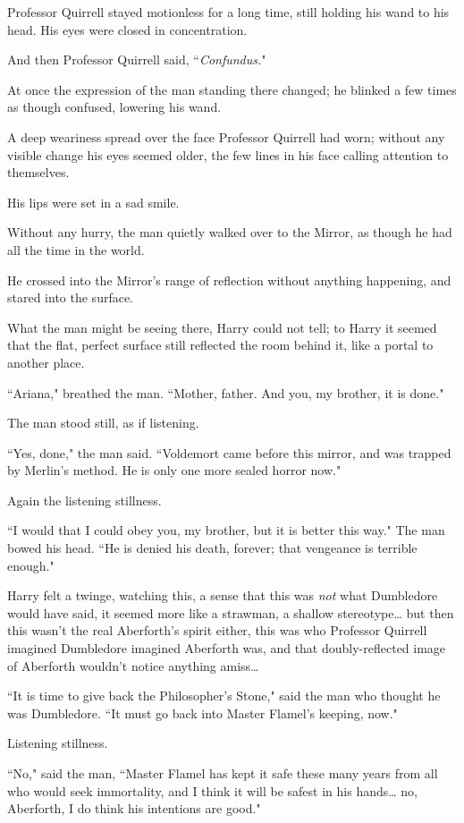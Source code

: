 Professor Quirrell stayed motionless for a long time, still holding his wand to his head. His eyes were closed in concentration.

And then Professor Quirrell said, ``\emph{Confundus.}"

At once the expression of the man standing there changed; he blinked a few times as though confused, lowering his wand.

A deep weariness spread over the face Professor Quirrell had worn; without any visible change his eyes seemed older, the few lines in his face calling attention to themselves.

His lips were set in a sad smile.

Without any hurry, the man quietly walked over to the Mirror, as though he had all the time in the world.

He crossed into the Mirror's range of reflection without anything happening, and stared into the surface.

What the man might be seeing there, Harry could not tell; to Harry it seemed that the flat, perfect surface still reflected the room behind it, like a portal to another place.

``Ariana," breathed the man. ``Mother, father. And you, my brother, it is done."

The man stood still, as if listening.

``Yes, done," the man said. ``Voldemort came before this mirror, and was trapped by Merlin's method. He is only one more sealed horror now."

Again the listening stillness.

``I would that I could obey you, my brother, but it is better this way." The man bowed his head. ``He is denied his death, forever; that vengeance is terrible enough."

Harry felt a twinge, watching this, a sense that this was \emph{not} what Dumbledore would have said, it seemed more like a strawman, a shallow stereotype{\ldots} but then this wasn't the real Aberforth's spirit either, this was who Professor Quirrell imagined Dumbledore imagined Aberforth was, and that doubly-reflected image of Aberforth wouldn't notice anything amiss{\ldots}

``It is time to give back the Philosopher's Stone," said the man who thought he was Dumbledore. ``It must go back into Master Flamel's keeping, now."

Listening stillness.

``No," said the man, ``Master Flamel has kept it safe these many years from all who would seek immortality, and I think it will be safest in his hands{\ldots} no, Aberforth, I do think his intentions are good."

